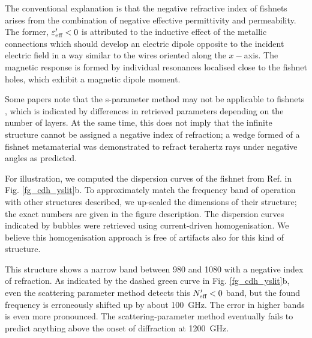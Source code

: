 
The conventional explanation is that the negative refractive index of fishnets arises from the combination of negative effective permittivity and permeability. The former, $\varepsilon_{\text{eff} }'<0$ is attributed to the inductive effect of the metallic connections which should develop an electric dipole opposite to the incident electric field in a way similar to the wires oriented along the $x-$axis. The magnetic response is formed by individual resonances localised close to the fishnet holes, which exhibit a magnetic dipole moment.

Some papers note that the s-parameter method may not be applicable to fishnets \cite{croenne2009left}\cite[p. 102]{croenne2009controle}, which is indicated by differences in retrieved parameters depending on the number of layers. At the same time, this does not imply that the infinite structure cannot be assigned a negative index of refraction; a wedge formed  of a fishnet metamaterial was demonstrated to refract terahertz rays under negative angles \cite{wang2010composite} as predicted. 

For illustration, we computed the dispersion curves of the fishnet from Ref. \cite{navarro2011dual} in Fig. \ref{fg_cdh_yslit}b. To approximately match the frequency band of operation with other structures described, we up-scaled the dimensions of their structure; the exact numbers are given in the figure description. The dispersion curves indicated by bubbles were retrieved using current-driven homogenisation. We believe this homogenisation approach is free of artifacts also for this kind of structure. 

This structure shows a narrow band between 980 and 1080 with a negative index of refraction. 
As indicated by the dashed green curve in Fig. \ref{fg_cdh_yslit}b, even the scattering parameter method detects this $N_{\text{eff} }'<0$ band, but the found frequency is erroneously shifted up by about 100~GHz. The error in higher bands is even more pronounced. The scattering-parameter method eventually fails to predict anything above the onset of diffraction at 1200~GHz.

